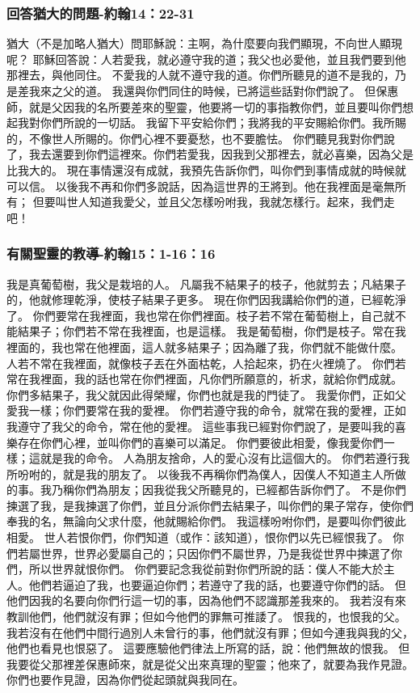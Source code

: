 \subsubsection{回答猶大的問題-約翰14：22-31}
猶大（不是加略人猶大）問耶穌說：主啊，為什麼要向我們顯現，不向世人顯現呢？
耶穌回答說：人若愛我，就必遵守我的道；我父也必愛他，並且我們要到他那裡去，與他同住。
不愛我的人就不遵守我的道。你們所聽見的道不是我的，乃是差我來之父的道。
我還與你們同住的時候，已將這些話對你們說了。
但保惠師，就是父因我的名所要差來的聖靈，他要將一切的事指教你們，並且要叫你們想起我對你們所說的一切話。
我留下平安給你們；我將我的平安賜給你們。我所賜的，不像世人所賜的。你們心裡不要憂愁，也不要膽怯。
你們聽見我對你們說了，我去還要到你們這裡來。你們若愛我，因我到父那裡去，就必喜樂，因為父是比我大的。
現在事情還沒有成就，我預先告訴你們，叫你們到事情成就的時候就可以信。
以後我不再和你們多說話，因為這世界的王將到。他在我裡面是毫無所有；
但要叫世人知道我愛父，並且父怎樣吩咐我，我就怎樣行。起來，我們走吧！

\subsubsection{有關聖靈的教導-約翰15：1-16：16}
我是真葡萄樹，我父是栽培的人。
凡屬我不結果子的枝子，他就剪去；凡結果子的，他就修理乾淨，使枝子結果子更多。
現在你們因我講給你們的道，已經乾淨了。
你們要常在我裡面，我也常在你們裡面。枝子若不常在葡萄樹上，自己就不能結果子；你們若不常在我裡面，也是這樣。
我是葡萄樹，你們是枝子。常在我裡面的，我也常在他裡面，這人就多結果子；因為離了我，你們就不能做什麼。
人若不常在我裡面，就像枝子丟在外面枯乾，人拾起來，扔在火裡燒了。
你們若常在我裡面，我的話也常在你們裡面，凡你們所願意的，祈求，就給你們成就。
你們多結果子，我父就因此得榮耀，你們也就是我的門徒了。
我愛你們，正如父愛我一樣；你們要常在我的愛裡。
你們若遵守我的命令，就常在我的愛裡，正如我遵守了我父的命令，常在他的愛裡。
這些事我已經對你們說了，是要叫我的喜樂存在你們心裡，並叫你們的喜樂可以滿足。
你們要彼此相愛，像我愛你們一樣；這就是我的命令。
人為朋友捨命，人的愛心沒有比這個大的。
你們若遵行我所吩咐的，就是我的朋友了。
以後我不再稱你們為僕人，因僕人不知道主人所做的事。我乃稱你們為朋友；因我從我父所聽見的，已經都告訴你們了。
不是你們揀選了我，是我揀選了你們，並且分派你們去結果子，叫你們的果子常存，使你們奉我的名，無論向父求什麼，他就賜給你們。
我這樣吩咐你們，是要叫你們彼此相愛。
世人若恨你們，你們知道（或作：該知道），恨你們以先已經恨我了。
你們若屬世界，世界必愛屬自己的；只因你們不屬世界，乃是我從世界中揀選了你們，所以世界就恨你們。
你們要記念我從前對你們所說的話：僕人不能大於主人。他們若逼迫了我，也要逼迫你們；若遵守了我的話，也要遵守你們的話。
但他們因我的名要向你們行這一切的事，因為他們不認識那差我來的。
我若沒有來教訓他們，他們就沒有罪；但如今他們的罪無可推諉了。
恨我的，也恨我的父。
我若沒有在他們中間行過別人未曾行的事，他們就沒有罪；但如今連我與我的父，他們也看見也恨惡了。
這要應驗他們律法上所寫的話，說：他們無故的恨我。
但我要從父那裡差保惠師來，就是從父出來真理的聖靈；他來了，就要為我作見證。
你們也要作見證，因為你們從起頭就與我同在。



